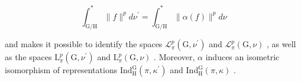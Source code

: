 \[
\int_ {\mathrm{G} / \mathrm{H}} ^ {*} \| f \| ^ {p} d \nu^ {\prime} = \int_ {\mathrm{G} / \mathrm{H}} ^ {*} \| \alpha (f) \| ^ {p} d \nu
\]

and makes it possible to identify the spaces \(\mathcal{L}_{\pi}^{p}(\mathrm{G},\nu^{\prime})\) and \(\mathcal{L}_{\pi}^{p}(\mathrm{G},\nu)\) , as well as the spaces \(\mathrm{L}_{\pi}^{p}(\mathrm{G},\nu^{\prime})\) and \(\mathrm{L}_{\pi}^{p}(\mathrm{G},\nu)\) . Moreover, \(\alpha\) induces an isometric isomorphism of representations \(\mathrm{Ind}_{\mathrm{H}}^{\mathrm{G}}(\pi,\kappa^{\prime})\) and \(\mathrm{Ind}_{\mathrm{H}}^{\mathrm{G}}(\pi,\kappa)\) .

